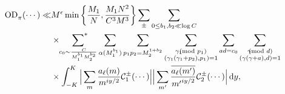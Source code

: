 \documentclass[12pt,a4paper,twoside, reqno]{amsart}
\newcommand{\shortmod}{\ensuremath{\negthickspace \negthickspace \negthickspace \pmod}}
\newcommand{\sumstar}{\sideset{}{^*}\sum}
\newcommand{\e}[2]{e\left(\frac{#1}{#2}\right)}
\begin{document}
\begin{align*}
       \mathrm{OD}_{\pi}^{}(\cdots) \ll & M^{\epsilon}\min\left\{\frac{M_1}{{N}}, \frac{M_1N^2}{C^3M^3}\right\} \sum_{\pm } \sum_{0 \leq b_1,  b_2 \ll \log C } \\
        & \times  \mathop{\sumstar_{ \substack{c_0 \sim \frac{C}{M_1^{b_1}M_2^{b_2}}
       } } }   \mathop{\sum}_{\substack{\alpha (M_1^{b_1})  }} \sum_{p_1p_2=M_2^{1+b_2}} \sum_{\substack{\gamma_1 \shortmod{p_1} \\ (\gamma_1(\gamma_1+p_2),p_1)=1}} \sum_{ad=c_0}\sum_{\substack{\gamma \shortmod{d} \\ (\gamma(\gamma+a),d)=1}}   \\
       & \times \int_{-K}^K \Big|\sum_m  \frac{ a_\ell(m)}{m^{iy/2}}   \mathcal{C}_1^{\pm}(\cdots)    \Big|  
        \Big|\sum_{m^\prime} \frac{\overline{a_\ell(m^\prime)}}{{m^\prime}^{iy/2}}   \mathcal{C}_2^{\pm}(\cdots ) \Big| \,\mathrm{d}y,
\end{align*}
\end{document}
